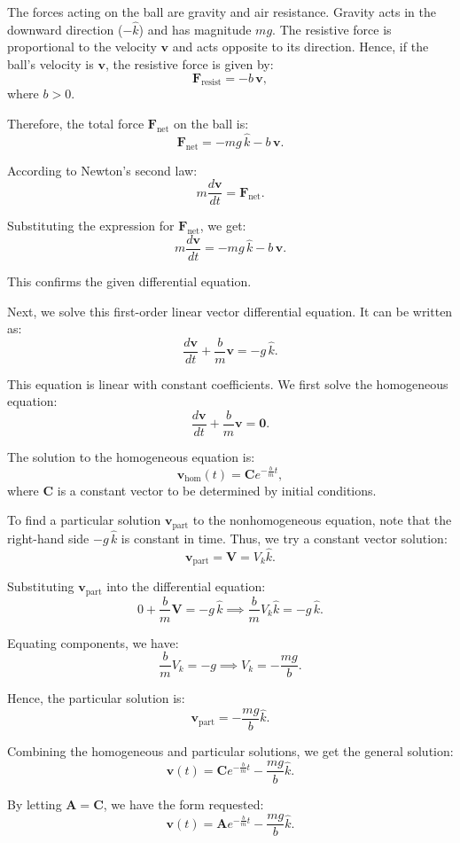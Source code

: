 \documentclass{article}
\begin{document}
The forces acting on the ball are gravity and air resistance. Gravity acts in the downward direction (\(-\hat{k}\)) and has magnitude \(mg\). The resistive force is proportional to the velocity \(\mathbf{v}\) and acts opposite to its direction. Hence, if the ball's velocity is \(\mathbf{v}\), the resistive force is given by:
\[
\mathbf{F}_{\text{resist}} = -b\,\mathbf{v},
\]
where \(b > 0\).

Therefore, the total force \(\mathbf{F}_{\text{net}}\) on the ball is:
\[
\mathbf{F}_{\text{net}} = -mg\,\hat{k} - b\,\mathbf{v}.
\]

According to Newton's second law:
\[
m \frac{d\mathbf{v}}{dt} = \mathbf{F}_{\text{net}}.
\]

Substituting the expression for \(\mathbf{F}_{\text{net}}\), we get:
\[
m \frac{d\mathbf{v}}{dt} = -mg\,\hat{k} - b\,\mathbf{v}.
\]

This confirms the given differential equation.

Next, we solve this first-order linear vector differential equation. It can be written as:
\[
\frac{d\mathbf{v}}{dt} + \frac{b}{m}\mathbf{v} = -g\,\hat{k}.
\]

This equation is linear with constant coefficients. We first solve the homogeneous equation:
\[
\frac{d\mathbf{v}}{dt} + \frac{b}{m}\mathbf{v} = \mathbf{0}.
\]

The solution to the homogeneous equation is:
\[
\mathbf{v}_\text{hom}(t) = \mathbf{C} e^{-\frac{b}{m}t},
\]
where \(\mathbf{C}\) is a constant vector to be determined by initial conditions.

To find a particular solution \(\mathbf{v}_\text{part}\) to the nonhomogeneous equation, note that the right-hand side \(-g\,\hat{k}\) is constant in time. Thus, we try a constant vector solution:
\[
\mathbf{v}_\text{part} = \mathbf{V} = V_k \hat{k}.
\]

Substituting \(\mathbf{v}_\text{part}\) into the differential equation:
\[
0 + \frac{b}{m}\mathbf{V} = -g\,\hat{k} \implies \frac{b}{m}V_k \hat{k} = -g\,\hat{k}.
\]

Equating components, we have:
\[
\frac{b}{m}V_k = -g \implies V_k = -\frac{mg}{b}.
\]

Hence, the particular solution is:
\[
\mathbf{v}_\text{part} = -\frac{mg}{b}\hat{k}.
\]

Combining the homogeneous and particular solutions, we get the general solution:
\[
\mathbf{v}(t) = \mathbf{C} e^{-\frac{b}{m}t} - \frac{mg}{b}\hat{k}.
\]

By letting \(\mathbf{A} = \mathbf{C}\), we have the form requested:
\[
\mathbf{v}(t) = \mathbf{A} e^{-\frac{b}{m}t} - \frac{mg}{b}\hat{k}.
\]
\end{document}
